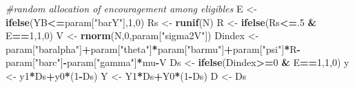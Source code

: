 \documentclass[]{book}
\newenvironment{Shaded}{\begin{snugshade}}{\end{snugshade}}
\newcommand{\CommentTok}[1]{\textcolor[rgb]{0.56,0.35,0.01}{\textit{#1}}}
\newcommand{\DecValTok}[1]{\textcolor[rgb]{0.00,0.00,0.81}{#1}}
\newcommand{\KeywordTok}[1]{\textcolor[rgb]{0.13,0.29,0.53}{\textbf{#1}}}
\newcommand{\NormalTok}[1]{#1}
\newcommand{\OperatorTok}[1]{\textcolor[rgb]{0.81,0.36,0.00}{\textbf{#1}}}
\newcommand{\StringTok}[1]{\textcolor[rgb]{0.31,0.60,0.02}{#1}}
\theoremstyle{definition}
\theoremstyle{definition}
\theoremstyle{definition}
\theoremstyle{remark}
\begin{document}
\begin{Shaded}
\begin{Highlighting}[]
\CommentTok{#random allocation of encouragement among eligibles}
\NormalTok{E <-}\StringTok{ }\KeywordTok{ifelse}\NormalTok{(YB}\OperatorTok{<=}\NormalTok{param[}\StringTok{"barY"}\NormalTok{],}\DecValTok{1}\NormalTok{,}\DecValTok{0}\NormalTok{)}
\NormalTok{Rs <-}\StringTok{ }\KeywordTok{runif}\NormalTok{(N)}
\NormalTok{R <-}\StringTok{ }\KeywordTok{ifelse}\NormalTok{(Rs}\OperatorTok{<=}\NormalTok{.}\DecValTok{5} \OperatorTok{&}\StringTok{ }\NormalTok{E}\OperatorTok{==}\DecValTok{1}\NormalTok{,}\DecValTok{1}\NormalTok{,}\DecValTok{0}\NormalTok{)}
\NormalTok{V <-}\StringTok{ }\KeywordTok{rnorm}\NormalTok{(N,}\DecValTok{0}\NormalTok{,param[}\StringTok{"sigma2V"}\NormalTok{])}
\NormalTok{Dindex <-}\StringTok{ }\NormalTok{param[}\StringTok{"baralpha"}\NormalTok{]}\OperatorTok{+}\NormalTok{param[}\StringTok{"theta"}\NormalTok{]}\OperatorTok{*}\NormalTok{param[}\StringTok{"barmu"}\NormalTok{]}\OperatorTok{+}\NormalTok{param[}\StringTok{"psi"}\NormalTok{]}\OperatorTok{*}\NormalTok{R}\OperatorTok{-}\NormalTok{param[}\StringTok{"barc"}\NormalTok{]}\OperatorTok{-}\NormalTok{param[}\StringTok{"gamma"}\NormalTok{]}\OperatorTok{*}\NormalTok{mu}\OperatorTok{-}\NormalTok{V}
\NormalTok{Ds <-}\StringTok{ }\KeywordTok{ifelse}\NormalTok{(Dindex}\OperatorTok{>=}\DecValTok{0} \OperatorTok{&}\StringTok{ }\NormalTok{E}\OperatorTok{==}\DecValTok{1}\NormalTok{,}\DecValTok{1}\NormalTok{,}\DecValTok{0}\NormalTok{)}
\NormalTok{y <-}\StringTok{ }\NormalTok{y1}\OperatorTok{*}\NormalTok{Ds}\OperatorTok{+}\NormalTok{y0}\OperatorTok{*}\NormalTok{(}\DecValTok{1}\OperatorTok{-}\NormalTok{Ds)}
\NormalTok{Y <-}\StringTok{ }\NormalTok{Y1}\OperatorTok{*}\NormalTok{Ds}\OperatorTok{+}\NormalTok{Y0}\OperatorTok{*}\NormalTok{(}\DecValTok{1}\OperatorTok{-}\NormalTok{Ds)}
\NormalTok{D <-}\StringTok{ }\NormalTok{Ds}


\end{Highlighting}
\end{Shaded}
\end{document}
